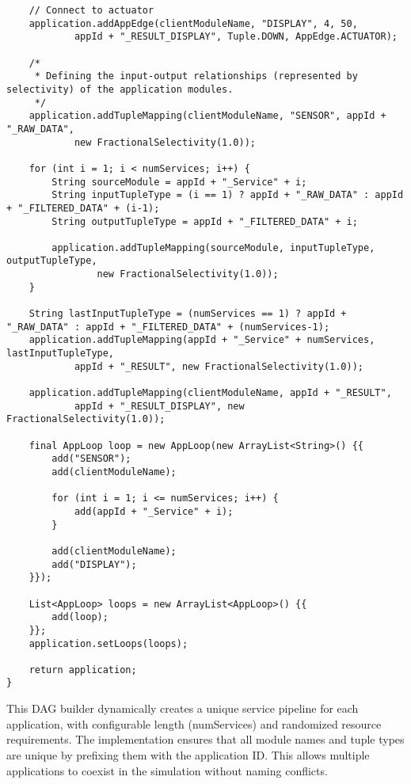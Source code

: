 \begin{verbatim}
    // Connect to actuator
    application.addAppEdge(clientModuleName, "DISPLAY", 4, 50,
            appId + "_RESULT_DISPLAY", Tuple.DOWN, AppEdge.ACTUATOR);

    /*
     * Defining the input-output relationships (represented by selectivity) of the application modules.
     */
    application.addTupleMapping(clientModuleName, "SENSOR", appId + "_RAW_DATA",
            new FractionalSelectivity(1.0));

    for (int i = 1; i < numServices; i++) {
        String sourceModule = appId + "_Service" + i;
        String inputTupleType = (i == 1) ? appId + "_RAW_DATA" : appId + "_FILTERED_DATA" + (i-1);
        String outputTupleType = appId + "_FILTERED_DATA" + i;

        application.addTupleMapping(sourceModule, inputTupleType, outputTupleType,
                new FractionalSelectivity(1.0));
    }

    String lastInputTupleType = (numServices == 1) ? appId + "_RAW_DATA" : appId + "_FILTERED_DATA" + (numServices-1);
    application.addTupleMapping(appId + "_Service" + numServices, lastInputTupleType,
            appId + "_RESULT", new FractionalSelectivity(1.0));

    application.addTupleMapping(clientModuleName, appId + "_RESULT",
            appId + "_RESULT_DISPLAY", new FractionalSelectivity(1.0));

    final AppLoop loop = new AppLoop(new ArrayList<String>() {{
        add("SENSOR");
        add(clientModuleName);

        for (int i = 1; i <= numServices; i++) {
            add(appId + "_Service" + i);
        }

        add(clientModuleName);
        add("DISPLAY");
    }});

    List<AppLoop> loops = new ArrayList<AppLoop>() {{
        add(loop);
    }};
    application.setLoops(loops);

    return application;
}
\end{verbatim}

This DAG builder dynamically creates a unique service pipeline for each application, with configurable length (numServices) and randomized resource requirements. The implementation ensures that all module names and tuple types are unique by prefixing them with the application ID. This allows multiple applications to coexist in the simulation without naming conflicts. 